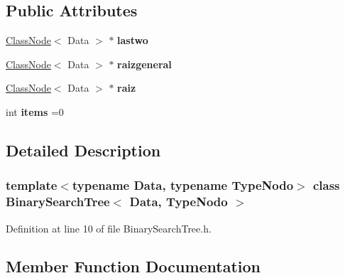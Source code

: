 \subsection*{Public Attributes}
\begin{DoxyCompactItemize}
\item 
\mbox{\label{class_binary_search_tree_a40d7f1eb0b7bec439eb6f9de881a98f6}} 
\hyperlink{class_class_node}{Class\+Node}$<$ Data $>$ $\ast$ {\bfseries lastwo}
\item 
\mbox{\label{class_binary_search_tree_af9be30092d814e2b0ba8f67557b7f0dd}} 
\hyperlink{class_class_node}{Class\+Node}$<$ Data $>$ $\ast$ {\bfseries raizgeneral}
\item 
\mbox{\label{class_binary_search_tree_aaf093b43d13167c591d4e329d8f239c0}} 
\hyperlink{class_class_node}{Class\+Node}$<$ Data $>$ $\ast$ {\bfseries raiz}
\item 
\mbox{\label{class_binary_search_tree_a187988de7db6639f0541d59ef27e8ab6}} 
int {\bfseries items} =0
\end{DoxyCompactItemize}


\subsection{Detailed Description}
\subsubsection*{template$<$typename Data, typename Type\+Nodo$>$\newline
class Binary\+Search\+Tree$<$ Data, Type\+Nodo $>$}



Definition at line 10 of file Binary\+Search\+Tree.\+h.



\subsection{Member Function Documentation}
\mbox{\label{class_binary_search_tree_a922ad2464f2085d208847a76fca1bb51}} 
